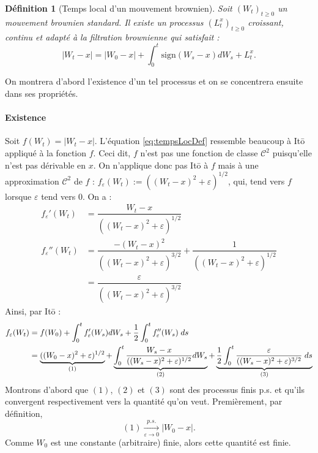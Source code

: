 \documentclass[openany]{book}
\makeatletter
\newcommand{\1}{\mathbbm{1}}
\newcommand{\sign}{\text{sign}}
\renewenvironment{proof}[1][\textbf{\textit{Démonstration}}]{%
  \par\pushQED{\qed}%
  \normalfont\topsep6\p@\@plus6\p@\relax
  \trivlist\item[\hskip\labelsep
    #1\@addpunct{.}]\ignorespaces
}{%
  \popQED\endtrivlist\@endpefalse
}
\theoremstyle{thmfont}
\theoremstyle{deffont}
\newtheorem{definition}[definition]{Définition}
\theoremstyle{thmfont}
\theoremstyle{deffont}
\makeatother
\begin{document}
\begin{definition}[Temps local d'un mouvement brownien]
  \label{def:TempsLoc}
  Soit $(W_t)_{t\geq0}$ un mouvement brownien standard. Il existe un processus $(L_t^x)_{t\geq0}$ croissant, continu et adapté à la filtration brownienne qui satisfait :
  \begin{equation}
    |W_t -x|  = |W_0-x| + \int_0^t\sign(W_s - x)dW_s + L_t^x.
    \label{eq:tempsLocDef}
  \end{equation}
\end{definition}

\begin{proof} On montrera d'abord l'existence d'un tel processus et on  se concentrera ensuite dans ses propriétés.

  \paragraph{Existence}
  Soit $f(W_t) = |W_t-x|$. L'équation \eqref{eq:tempsLocDef} ressemble beaucoup à Itō appliqué à la fonction $f$. Ceci dit, $f$ n'est pas une fonction de classe $\mathcal C^2$ puisqu'elle n'est pas dérivable en $x$. On n'applique donc pas Itō à $f$ mais à une approximation $\mathcal C^2$ de $f$ : $f_\varepsilon(W_t):= ((W_t-x)^2 +\varepsilon)^{1/2}$, qui, tend vers $f$ lorsque $\varepsilon$ tend vers 0. On a :
  \begin{align*}
    f_\varepsilon'(W_t) &= \dfrac{W_t-x}{((W_t-x)^2 +\varepsilon)^{1/2}}\\
    f_\varepsilon''(W_t)&= \dfrac{-(W_t-x)^2}{((W_t-x)^2 +\varepsilon)^{3/2}} + \dfrac{1}{((W_t-x)^2 +\varepsilon)^{1/2}}\\
              &= \dfrac{\varepsilon}{((W_t-x)^2 +\varepsilon)^{3/2}}
  \end{align*}
  Ainsi, par Itō :
  \begin{align}
    f_\varepsilon(W_t) &= f(W_0) + \int_0^t f_\varepsilon'(W_s) dW_s + \dfrac{1}{2} \int_0^t f_\varepsilon''(W_s) \; ds\label{eq:tempsLocApprox}\\
             &= \underbrace{((W_0 -x)^2 + \varepsilon)^{1/2}}_{(1)} + \underbrace{\int_0^t \dfrac{W_s-x}{((W_s-x)^2 +\varepsilon)^{1/2}}dW_s}_{(2)} + \underbrace{\dfrac{1}{2} \int_0^t \dfrac{\varepsilon}{((W_s-x)^2 +\varepsilon)^{3/2}} \; ds}_{(3)} \notag
  \end{align}
  Montrons d'abord que $(1)$, $(2)$ et $(3)$ sont des processus finis p.s. et qu'ils convergent respectivement vers la quantité qu'on veut. Premièrement, par définition,
  $$(1) \xrightarrow[\varepsilon \to 0]{p.s.}  |W_0 -x|.$$
  \noindent Comme $W_0$ est une constante (arbitraire) finie, alors cette quantité est finie.\\


\end{proof}
\end{document}
